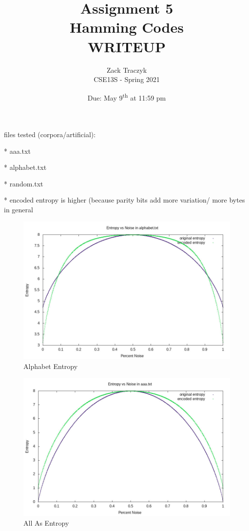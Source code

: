 \documentclass[12pt]{article}
\title{%
	\textbf{Assignment 5 \\ 
		Hamming Codes \\
\large WRITEUP} }
\author{Zack Traczyk \\ CSE13S - Spring 2021}
\date{Due: May 9\textsuperscript{th} at 11:59 pm}
\begin{document}
\maketitle

files tested (corpora/artificial):

  * aaa.txt

  * alphabet.txt

  * random.txt

* encoded entropy is higher (because parity bits add more variation/ more bytes
in general

\begin{figure}[H]
	\caption{Alphabet Entropy}\label{alphabet_entropy}
	\includegraphics[width=6in]{alphabet.txt.entropy.jpg}
	\centering
\end{figure}

\begin{figure}[H]
	\caption{All As Entropy}\label{aaa_entropy}
	\includegraphics[width=6in]{aaa.txt.entropy.jpg}
	\centering
\end{figure}
\end{document}
